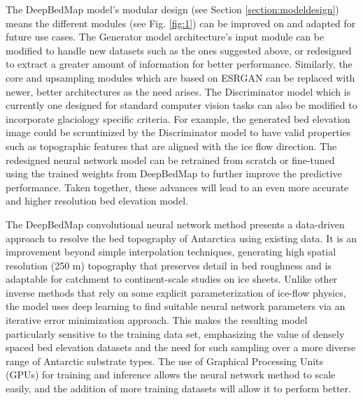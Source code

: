 \documentclass[tc, manuscript]{copernicus}
\begin{document}
The DeepBedMap model's modular design (see Section \ref{section:modeldesign}) means the different modules (see Fig. \ref{fig:1}) can be improved on and adapted for future use cases.
The Generator model architecture's input module can be modified to handle new datasets such as the ones suggested above, or redesigned to extract a greater amount of information for better performance.
Similarly, the core and upsampling modules which are based on ESRGAN \citep{WangESRGANEnhancedSuperResolution2019} can be replaced with newer, better architectures as the need arises.
The Discriminator model which is currently one designed for standard computer vision tasks can also be modified to incorporate glaciology specific criteria.
For example, the generated bed elevation image could be scruntinized by the Discriminator model to have valid properties such as topographic features that are aligned with the ice flow direction.
The redesigned neural network model can be retrained from scratch or fine-tuned using the trained weights from DeepBedMap to further improve the predictive performance.
Taken together, these advances will lead to an even more accurate and higher resolution bed elevation model.

\conclusions  %

The DeepBedMap convolutional neural network method presents a data-driven approach to resolve the bed topography of Antarctica using existing data.
It is an improvement beyond simple interpolation techniques, generating high spatial resolution (250 m) topography that preserves detail in bed roughness and is adaptable for catchment to continent-scale studies on ice sheets.
Unlike other inverse methods that rely on some explicit parameterization of ice-flow physics, the model uses deep learning to find suitable neural network parameters via an iterative error minimization approach.
This makes the resulting model particularly sensitive to the training data set, emphasizing the value of densely spaced bed elevation datasets and the need for such sampling over a more diverse range of Antarctic substrate types.
The use of Graphical Processing Units (GPUs) for training and inference allows the neural network method to scale easily, and the addition of more training datasets will allow it to perform better.
\end{document}
